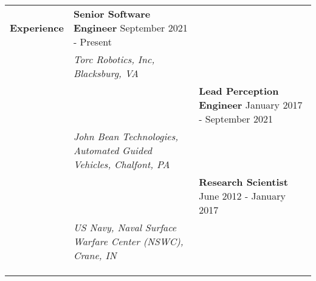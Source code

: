 \begin{tabular}{L{\hlcolw}  L{\rcolw}}
\textbf{\Large Experience} & \textbf{\large Senior Software Engineer} \hfill {\large September 2021 - Present}  
\vspace{0.05in} 
\\
& \textit{\large Torc Robotics, Inc, Blacksburg, VA} \\ 
&
\vspace{-0.2in} 

& \textbf{\large Lead Perception Engineer} \hfill {\large January 2017 - September 2021}  
\vspace{0.05in} 
\\
& \textit{\large John Bean Technologies, Automated Guided Vehicles, Chalfont, PA} \\ 
&
\vspace{-0.2in} 


& \textbf{\large Research Scientist} \hfill {\large June 2012 - January 2017}  
\vspace{0.05in} \\
& \textit{\large US Navy, Naval Surface Warfare Center (NSWC), Crane, IN} \\ 
&
\vspace{-0.2in} 

\\

\\
	\hline 
	\hline \\  
\end{tabular}